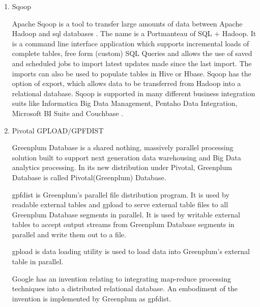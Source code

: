 \begin{enumerate}
\item {} 
Sqoop

Apache Sqoop is a tool to transfer large amounts of data between
Apache Hadoop and sql databases \label{\detokenize{i524/technologies:id499}}{\hyperref[\detokenize{i524/technologies:www-sqoop}]{\sphinxcrossref{{[}429{]}}}}. The name is a
Portmanteau of SQL + Hadoop. It is a command line interface
application which supports incremental loads of complete tables,
free form (custom) SQL Queries and allows the use of saved and
scheduled jobs to import latest updates made since the last
import. The imports can also be used to populate tables in Hive
or Hbase. Sqoop has the option of export, which allows data to be
transferred from Hadoop into a relational database. Sqoop is
supported in many different business integration suits like
Informatica Big Data Management, Pentaho Data Integration,
Microsoft BI Suite and Couchbase \label{\detokenize{i524/technologies:id500}}{\hyperref[\detokenize{i524/technologies:sqoop-wiki}]{\sphinxcrossref{{[}430{]}}}}.

\item {} 
Pivotal GPLOAD/GPFDIST

Greenplum Database \label{\detokenize{i524/technologies:id501}}{\hyperref[\detokenize{i524/technologies:book-greenplum-gollapudi2013}]{\sphinxcrossref{{[}431{]}}}} is a
shared nothing, massively parallel processing solution built to
support next generation data warehousing and Big Data analytics
processing. In its new distribution under Pivotal, Greenplum
Database is called Pivotal(Greenplum) Database.

gpfdist \label{\detokenize{i524/technologies:id502}}{\hyperref[\detokenize{i524/technologies:www-gpfdist}]{\sphinxcrossref{{[}432{]}}}} is Greenplum's parallel file
distribution program. It is used by readable external tables and
gpload to serve external table files to all Greenplum Database
segments in parallel. It is used by writable external tables to
accept output streams from Greenplum Database segments in
parallel and write them out to a file.

gpload \label{\detokenize{i524/technologies:id503}}{\hyperref[\detokenize{i524/technologies:book-greenplum-gollapudi2013}]{\sphinxcrossref{{[}431{]}}}} is data loading
utility is used to load data into Greenplum's external table in
parallel.

Google has an invention \label{\detokenize{i524/technologies:id504}}{\hyperref[\detokenize{i524/technologies:patent-google-gpf}]{\sphinxcrossref{{[}433{]}}}} relating to
integrating map-reduce processing techniques into a distributed
relational database. An embodiment of the invention is
implemented by Greenplum as gpfdist.

\end{enumerate}


